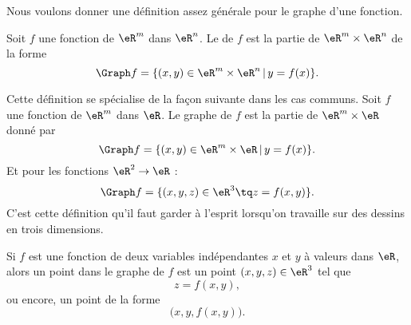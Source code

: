 
Nous voulons donner une définition assez générale pour le graphe d'une fonction.
\begin{definition}
	Soit \( f\) une fonction de \( \eR^m\) dans \( \eR^n\). Le  de \( f\) est la partie de \( \eR^m\times \eR^n\) de la forme
	\begin{equation}
		\Graph f= \{ (x,y)\in \eR^m\times \eR^n \,|\, y=f(x)\}.
	\end{equation}
\end{definition}

Cette définition se spécialise de la façon suivante dans les cas communs. Soit \( f\) une fonction de \( \eR^m\) dans \( \eR\). Le graphe de \( f\) est la partie de \( \eR^m\times \eR\) donné par
\begin{equation}
	\Graph f= \{ (x,y)\in \eR^m\times \eR \,|\, y=f(x)\}.
\end{equation}
Et pour les fonctions \( \eR^2\to \eR\) :
\begin{equation}
	\Graph f= \{ (x,y,z)\in\eR^3\tq z=f(x,y) \}.
\end{equation}
C'est cette définition qu'il faut garder à l'esprit lorsqu'on travaille sur des dessins en trois dimensions.

Si \( f\) est une fonction de deux variables indépendantes \( x\) et \( y\) à valeurs dans \( \eR\), alors un point dans le graphe de \( f\) est un point \( (x,y,z)\in\eR^3\) tel que
\begin{equation}
	z=f(x,y),
\end{equation}
ou encore, un point de la forme
\begin{equation}
	\big( x,y,f(x,y) \big).
\end{equation}


